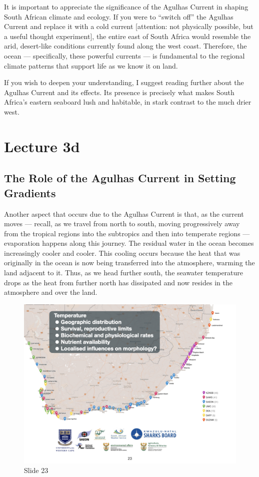 \documentclass[
  11pt,
]{book}
\begin{document}
It is important to appreciate the significance of the Agulhas Current in
shaping South African climate and ecology. If you were to ``switch off''
the Agulhas Current and replace it with a cold current {[}attention: not
physically possible, but a useful thought experiment{]}, the entire east
of South Africa would resemble the arid, desert-like conditions
currently found along the west coast. Therefore, the ocean ---
specifically, these powerful currents --- is fundamental to the regional
climate patterns that support life as we know it on land.

If you wish to deepen your understanding, I suggest reading further
about the Agulhas Current and its effects. Its presence is precisely
what makes South Africa's eastern seaboard lush and habitable, in stark
contrast to the much drier west.

\chapter*{Lecture 3d}\label{lecture-3d}

\section{The Role of the Agulhas Current in Setting
Gradients}\label{the-role-of-the-agulhas-current-in-setting-gradients}

Another aspect that occurs due to the Agulhas Current is that, as the
current moves --- recall, as we travel from north to south, moving
progressively away from the tropical regions into the subtropics and
then into temperate regions --- evaporation happens along this journey.
The residual water in the ocean becomes increasingly cooler and cooler.
This cooling occurs because the heat that was originally in the ocean is
now being transferred into the atmosphere, warming the land adjacent to
it. Thus, as we head further south, the seawater temperature drops as
the heat from further north has dissipated and now resides in the
atmosphere and over the land.

\begin{figure}[ht]
\centering
\includegraphics[width=0.8\linewidth]{../images/BDC334/BDC334-023.jpeg}
\caption*{Slide 23}
\end{figure}
\end{document}
